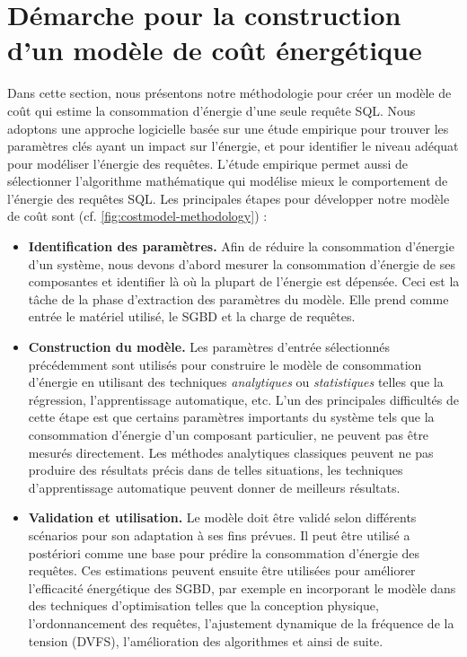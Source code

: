 \section{Démarche pour la construction d'un modèle de coût énergétique}\label{DemarcheConstruction}
Dans cette section, nous présentons notre méthodologie pour créer un modèle de coût qui estime la consommation d'énergie d'une seule requête SQL.
Nous adoptons une approche logicielle basée sur une étude empirique pour trouver les paramètres clés ayant un impact sur l'énergie, et pour identifier le niveau adéquat pour modéliser l'énergie des requêtes. L'étude empirique permet aussi de sélectionner l'algorithme mathématique qui modélise mieux le comportement de l'énergie des requêtes SQL. Les principales étapes pour développer notre modèle de coût sont (cf. \ref{fig:costmodel-methodology}) :

\begin{itemize}
 \item \textbf{Identification des paramètres.} Afin de réduire la consommation d'énergie d'un système, nous devons d'abord mesurer la consommation d'énergie de ses composantes et identifier là où la plupart de l'énergie est dépensée. Ceci est la tâche de la phase d'extraction des paramètres du modèle. Elle prend comme entrée le matériel utilisé, le SGBD et la charge de requêtes.
 \item \textbf{Construction du modèle.} Les paramètres d'entrée sélectionnés précédemment sont utilisés pour construire le modèle de consommation d'énergie en utilisant des techniques \textit{analytiques} ou \textit{statistiques} telles que la régression, l'apprentissage automatique, etc. L'un des principales difficultés de cette étape est que certains paramètres importants du système tels que la consommation d'énergie d'un composant particulier, ne peuvent pas être mesurés directement. Les méthodes analytiques classiques peuvent ne pas produire des résultats précis dans de telles situations, les techniques d'apprentissage automatique peuvent donner de meilleurs résultats.
 \item \textbf{Validation et utilisation.} Le modèle doit être validé selon différents scénarios pour son adaptation à ses fins prévues. Il peut être utilisé a postériori comme une base pour prédire la consommation d'énergie des requêtes. Ces estimations peuvent ensuite être utilisées pour améliorer l'efficacité énergétique des SGBD, par exemple en incorporant le modèle dans des techniques d'optimisation telles que la conception physique, l'ordonnancement des requêtes, l'ajustement dynamique de la fréquence de la tension (DVFS), l'amélioration des algorithmes et ainsi de suite.
\end{itemize}

